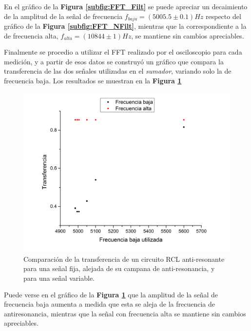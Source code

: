 \documentclass[11pt,a4paper]{article}
\begin{document}
En el gráfico de la \textbf{Figura \ref{subfig:FFT_Filt}} se puede apreciar un decaimiento de la amplitud de la señal de frecuencia $f_{baja}= (5005.5 \pm 0.1)Hz$ respecto del gráfico de la \textbf{Figura \ref{subfig:FFT_NFilt}}, mientras que la correspondiente a la de frecuencia alta, $f_{alta} = (10844 \pm 1)Hz$, se mantiene sin cambios apreciables.

Finalmente se procedio a utilizar el FFT realizado por el osciloscopio para cada medición, y a partir de esos datos se construyó un gráfico que compara la transferencia de las dos señales utilizadas en el \textit{sumador}, variando solo la de frecuencia baja. Los resultados se muestran en la \textbf{Figura \ref{fig:Comp}}

\begin{figure}[H]
\centering
\includegraphics[scale=0.4]{Comparacion}
\caption{Comparación de la transferencia de un circuito RCL anti-resonante para una señal fija, alejada de su campana de anti-resonancia, y para una señal variable.}
\label{fig:Comp}
\end{figure}

Puede verse en el gráfico de la \textbf{Figura \ref{fig:Comp}} que la amplitud de la señal de frecuencia baja aumenta a medida que esta se aleja de la frecuencia de antiresonancia, mientras que la señal con frecuencia alta se mantiene sin cambios apreciables.


\end{document}
